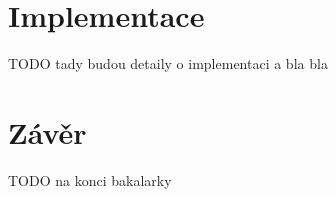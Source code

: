 \documentclass[
  digital,     %
  oneside,     %
  nosansbold,  %
  nocolorbold, %
  lof,         %
  lot,         %
]{fithesis4}
\begin{document}
\chapter{Implementace}

TODO tady budou detaily o implementaci a bla bla




\chapter*{Závěr}

TODO na konci bakalarky

\printbibliography[heading=bibintoc] %
\end{document}
